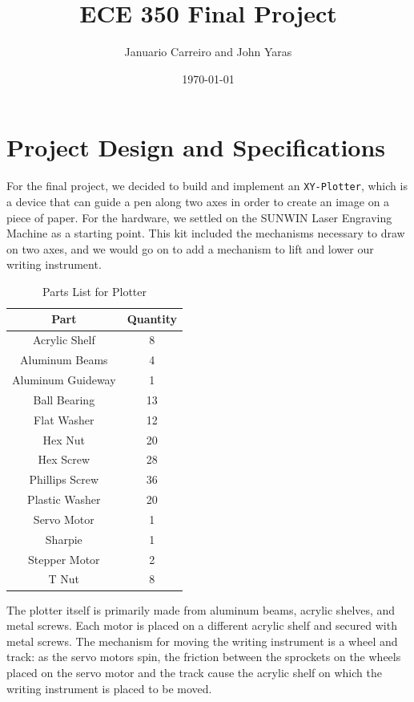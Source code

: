 \documentclass[12pt]{article}
\begin{document}
\title{ECE 350 Final Project}
\author{Januario Carreiro and John Yaras}
\date{\today}

\maketitle

\thispagestyle{fancy}

\newpage

\section{Project Design and Specifications}
For the final project, we decided to build and implement an {\tt XY-Plotter}, which is a device that can guide a pen along two axes in order to create an image on a piece of paper. For the hardware, we settled on the SUNWIN Laser Engraving Machine as a starting point. This kit included the mechanisms necessary to draw on two axes, and we would go on to add a mechanism to lift and lower our writing instrument.

\begin{table}[ht!]
\centering
\begin{tabular}{|c|c|} \hline
Part & Quantity \\ \hline \hline
Acrylic Shelf & 8 \\ \hline
Aluminum Beams & 4 \\ \hline
Aluminum Guideway & 1 \\ \hline
Ball Bearing & 13 \\ \hline
Flat Washer & 12 \\ \hline
Hex Nut & 20 \\ \hline
Hex Screw & 28 \\ \hline
Phillips Screw & 36 \\ \hline
Plastic Washer & 20 \\ \hline
Servo Motor & 1 \\ \hline
Sharpie & 1 \\ \hline
Stepper Motor & 2 \\ \hline
T Nut & 8 \\ \hline
\end{tabular}
\caption{Parts List for Plotter}
\end{table}

The plotter itself is primarily made from aluminum beams, acrylic shelves, and metal screws. Each motor is placed on a different acrylic shelf and secured with metal screws. The mechanism for moving the writing instrument is a wheel and track: as the servo motors spin, the friction between the sprockets on the wheels placed on the servo motor and the track cause the acrylic shelf on which the writing instrument is placed to be moved.
\end{document}
